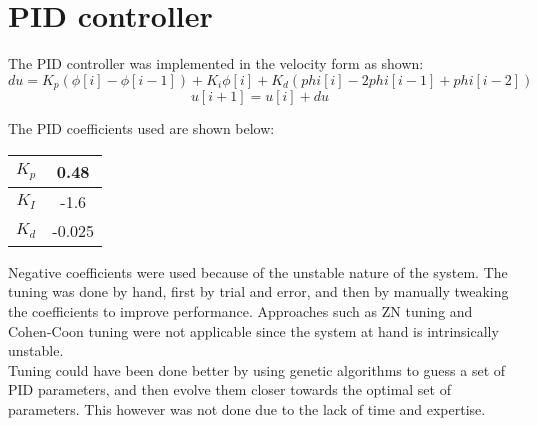 \section{PID controller}

The PID controller was implemented in the velocity form as shown: $$ du = K_{p}(\phi[i]-\phi[i-1]) + K_{i}\phi[i] + K_{d}(phi[i]-2phi[i-1]+phi[i-2])$$ 
$$u[i+1] =  u[i] + du $$

The PID coefficients used are shown below:
\begin{center}
\begin{tabular}{ | c | c | }
	\hline
	$K_{p}$ 		& 0.48	 \\
	\hline
	$K_{I}$		& -1.6	 \\  
	\hline
	$K_{d}$		& -0.025	 \\
	\hline
\end{tabular}
\end{center}

Negative coefficients were used because of the unstable nature of the system. The tuning was done by hand, first by trial and error, and then by manually tweaking the coefficients to improve performance. Approaches such as ZN tuning and Cohen-Coon tuning were not applicable since the system at hand is intrinsically unstable. \\

Tuning could have been done better by using genetic algorithms to guess a set of PID parameters, and then evolve them closer towards the optimal set of parameters. This however was not done due to the lack of time and expertise. 